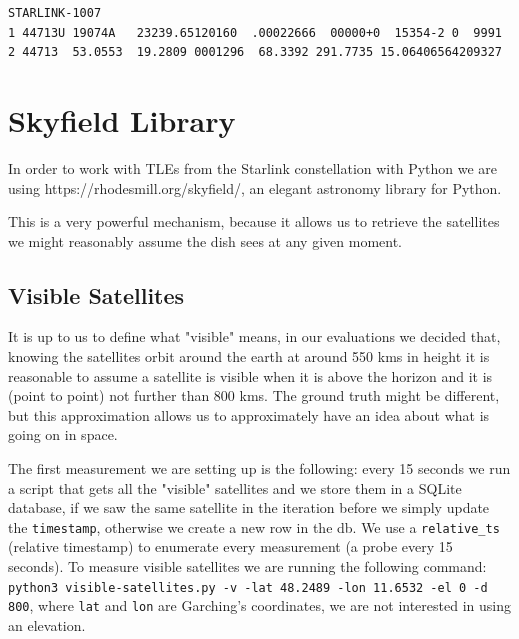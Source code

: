 \documentclass[IN,11pt,twoside,openright,bachelor,english]{tumthesis}
\begin{document}
\begin{lstlisting}[caption={TLE for satellite STARLINK-1007 },captionpos=b]
STARLINK-1007           
1 44713U 19074A   23239.65120160  .00022666  00000+0  15354-2 0  9991
2 44713  53.0553  19.2809 0001296  68.3392 291.7735 15.06406564209327
\end{lstlisting}

	
\section{Skyfield Library}

In order to work with TLEs from the Starlink constellation with Python we are using https://rhodesmill.org/skyfield/, an elegant astronomy library for Python.




This is a very powerful mechanism, because it allows us to retrieve the satellites we might reasonably assume the dish sees at any given moment.
\subsection{Visible Satellites}
It is up to us to define what "visible" means, in our evaluations we decided that, knowing the satellites orbit around the earth at around 550 kms in height it is reasonable to assume a satellite is visible when it is above the horizon and it is (point to point) not further than 800 kms. The ground truth might be different, but this approximation allows us to approximately have an idea about what is going on in space. 

The first measurement we are setting up is the following: every 15 seconds we run a script that gets all the "visible" satellites and we store them in a SQLite database, if we saw the same satellite in the iteration before we simply update the \texttt{timestamp}, otherwise we create a new row in the db. We use a \texttt{relative\_ts} (relative timestamp) to enumerate every measurement (a probe every 15 seconds). To measure visible satellites we are running the following command: \texttt{python3 visible-satellites.py -v -lat 48.2489 -lon 11.6532 -el 0 -d 800}, where \texttt{lat} and \texttt{lon} are Garching's coordinates, we are not interested in using an elevation.
\end{document}
